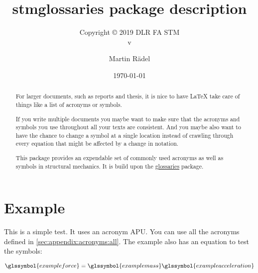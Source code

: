 \documentclass{scrartcl}
\author{Martin R\"{a}del}
\title{stmglossaries package description}
\subtitle{Copyright \copyright{} 2019 DLR FA STM\\v\DTMsetdatestyle{versiondate}\DTMtoday}
\date{\today}
\begin{document}
\maketitle

\begin{abstract}
For larger documents, such as reports and thesis, it is nice to have \LaTeX{} take care of things like a list of acronyms or symbols.

If you write multiple documents you maybe want to make sure that the acronyms and symbols you use throughout all your texts are consistent. And you maybe also want to have the chance to change a symbol at a single location instead of crawling through every equation that might be affected by a change in notation.

This package provides an expendable set of commonly used acronyms as well as symbols in structural mechanics. It is build upon the \href{https://ctan.org/pkg/glossaries?lang=en}{glossaries} package.
\end{abstract}

\tableofcontents

\section{Example}

This is a simple test. It uses an acronym \gls{APU}. You can use all the acronyms defined in \autoref{sec:appendix:acronyms:all}. The example also has an equation to test the symbols:


\begin{equation}  
\glssymbol{exampleforce} = \glssymbol{examplemass}\glssymbol{exampleacceleration}
\end{equation}

% 
% 
\end{document}
